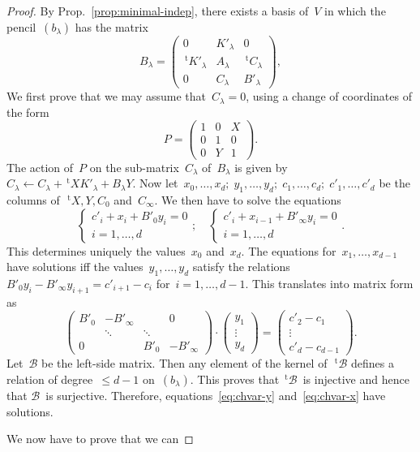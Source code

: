 \documentclass{lms}%
\let\ro\mathscr
\def\transpose{\,{}^{\mathrm{t}\!}}
\def\mat#1{\begin{pmatrix}#1\end{pmatrix}}
\begin{document}
\begin{proof}
By Prop.~\ref{prop:minimal-indep}, there exists a basis of~$V$ in which
the pencil~$(b_{λ})$ has the matrix
\begin{equation}\label{eq:matrix-b1}
B_{λ} = \mat{0 & K'_{λ} & 0\\\transpose{K'_{λ}} & A_{λ}&\transpose{C_{λ}}\\
  0 & C_{λ} & B'_{λ}},
\end{equation}
We first prove that we may assume that~$C_{λ} = 0$, using a change of
coordinates of the form
\begin{equation}\label{eq:p1}
P = \mat{1 & 0 & X\\0&1&0\\0&Y&1}.
\end{equation}
The action of~$P$ on the sub-matrix~$C_{λ}$ of~$B_{λ}$ is given by $C_{λ}
← C_{λ} + \transpose{X} K'_{λ} + B_{λ} Y$. Now let~$x_0,…,x_{d};\;
y_1,…,y_d;\; c_1,…,c_d;\; c'_1,…,c'_d$ be the columns of~$\transpose{X}, Y,
C_0$ and~$C_{∞}$. We then have to
solve the equations
\begin{equation}\label{eq:chvar-x}
\begin{cases} c'_i + x_i + B'_0 y_i = 0\\ i = 1,…,d\end{cases};\quad
\begin{cases} c'_i + x_{i-1} + B'_∞ y_i = 0\\i=1,…,d\end{cases}.
\end{equation}
This determines uniquely the values~$x_0$ and~$x_{d}$. The equations
for~$x_1,…,x_{d-1}$ have solutions iff the values~$y_1,…,y_d$ satisfy
the relations
$B'_0 y_i - B'_{∞} y_{i+1} = c'_{i+1} - c_i$ for~$i = 1,…,d-1$. This
translates into matrix form as
\begin{equation}\label{eq:chvar-y}
\mat{B'_0&-B'_{∞}&&0\\&⋱&⋱&\\0&&B'_0&-B'_{∞}} ·
  \mat{y_1\\⋮\\y_d} = \mat{c'_2-c_1\\⋮\\c'_d-c_{d-1}}.
\end{equation}
Let~$\ro B$ be the left-side matrix. Then any element of the kernel
of~$\transpose{\ro B}$ defines a relation of degree~$≤ d-1$ on~$(b_{λ})$.
This proves that $\transpose{\ro B}$~is injective and hence that $\ro
B$~is surjective. Therefore, equations~\eqref{eq:chvar-y}
and~\eqref{eq:chvar-x} have solutions.

We now have to prove that we can
\end{proof}
\end{document}
